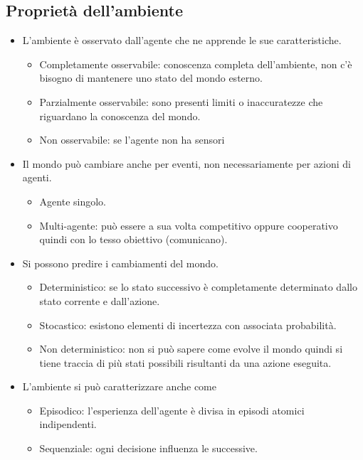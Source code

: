 \documentclass{article}
\begin{document}
\subsection{Proprietà dell'ambiente}
\begin{itemize}
    \item L'ambiente è osservato dall'agente che ne apprende le sue caratteristiche.
        \begin{itemize}
            \item Completamente osservabile: conoscenza completa dell'ambiente, non c'è bisogno di mantenere uno stato del mondo esterno.
            \item Parzialmente osservabile: sono presenti limiti o inaccuratezze che riguardano la conoscenza del mondo.
            \item Non osservabile: se l'agente non ha sensori
        \end{itemize}
    \item Il mondo può cambiare anche per eventi, non necessariamente per azioni di agenti.
        \begin{itemize}
            \item Agente singolo.
            \item Multi-agente: può essere a sua volta competitivo oppure cooperativo quindi con lo tesso obiettivo (comunicano).
        \end{itemize}
    \item Si possono predire i cambiamenti del mondo.
        \begin{itemize}
            \item Deterministico: se lo stato successivo è completamente determinato dallo stato corrente e dall'azione.
            \item Stocastico: esistono elementi di incertezza con associata probabilità.
            \item Non deterministico: non si può sapere come evolve il mondo quindi si tiene traccia di più stati possibili risultanti da una azione eseguita.
        \end{itemize}
    \item L'ambiente si può caratterizzare anche come 
        \begin{itemize}
            \item Episodico: l'esperienza dell'agente è divisa in episodi atomici indipendenti.
            \item Sequenziale: ogni decisione influenza le successive.
        \end{itemize}

\end{itemize}
\end{document}
